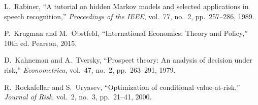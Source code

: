 \documentclass[onecolumn,ieee]{arithmaxresearch}
\begin{document}
\begin{thebibliography}{12}
L.~Rabiner,
``A tutorial on hidden Markov models and selected applications in speech recognition,''
\emph{Proceedings of the IEEE}, vol.~77, no.~2, pp.~257--286, 1989.

P.~Krugman and M.~Obstfeld,
``International Economics: Theory and Policy,''
10th ed. Pearson, 2015.

D.~Kahneman and A.~Tversky,
``Prospect theory: An analysis of decision under risk,''
\emph{Econometrica}, vol.~47, no.~2, pp.~263--291, 1979.

R.~Rockafellar and S.~Uryasev,
``Optimization of conditional value-at-risk,''
\emph{Journal of Risk}, vol.~2, no.~3, pp.~21--41, 2000.

\end{thebibliography}
\end{document}

